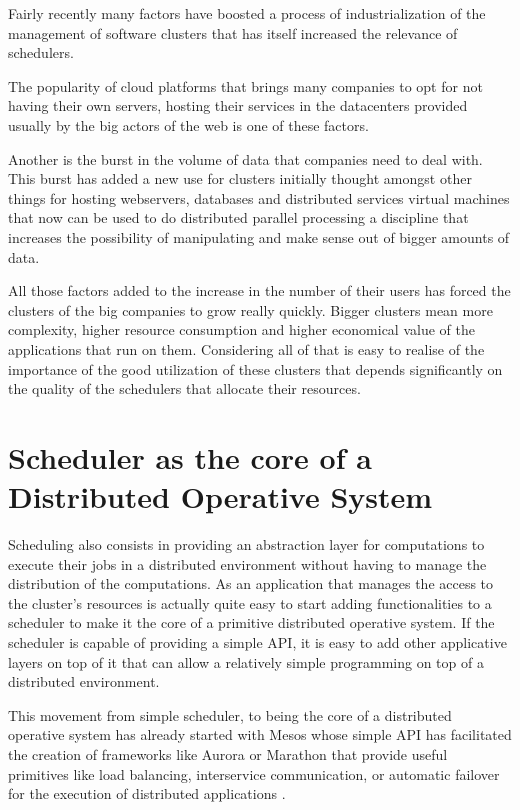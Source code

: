 \documentclass{report}                     %
\begin{document}
Fairly recently many factors have boosted a process of
industrialization of the management of software clusters that has
itself increased the relevance of schedulers. 

The popularity of cloud platforms that brings many companies to opt
for not having their own servers, hosting their services in the
datacenters provided usually by the big actors of the web is one of
these factors.

Another is the burst in the volume of data that companies need to deal
with. This burst has added a new use for clusters initially thought
amongst other things for hosting webservers, databases and distributed
services virtual machines that now can be used to do distributed
parallel processing a discipline that increases the possibility of
manipulating and make sense out of bigger amounts of data.

All those factors added to the increase in the number of their users
has forced the clusters of the big companies to grow really
quickly. Bigger clusters mean more complexity, higher resource
consumption and higher economical value of the applications that run
on them. Considering all of that is easy to realise of the importance
of the good utilization of these clusters that depends significantly
on the quality of the schedulers that allocate their resources.


\section{Scheduler as the core of a Distributed Operative System}

Scheduling also consists in providing an abstraction layer for
computations to execute their jobs in a distributed environment
without having to manage the distribution of the
computations. As an application that manages the access to
the cluster's resources is actually quite easy to start adding
functionalities to a scheduler to make it the core of a primitive
distributed operative system. If the scheduler is capable of providing
a simple API, it is easy to add other applicative layers on top of
it that can allow a relatively simple programming on top of a
distributed environment.

This movement from simple scheduler, to being the core of a
distributed operative system has already started with Mesos whose
simple API has facilitated the creation of frameworks like Aurora
\cite{_apache_????-1} or Marathon \cite{_mesosphere/marathon_????}
that provide useful primitives like load balancing, interservice
communication, or automatic failover for the execution of distributed
applications .
\end{document}
